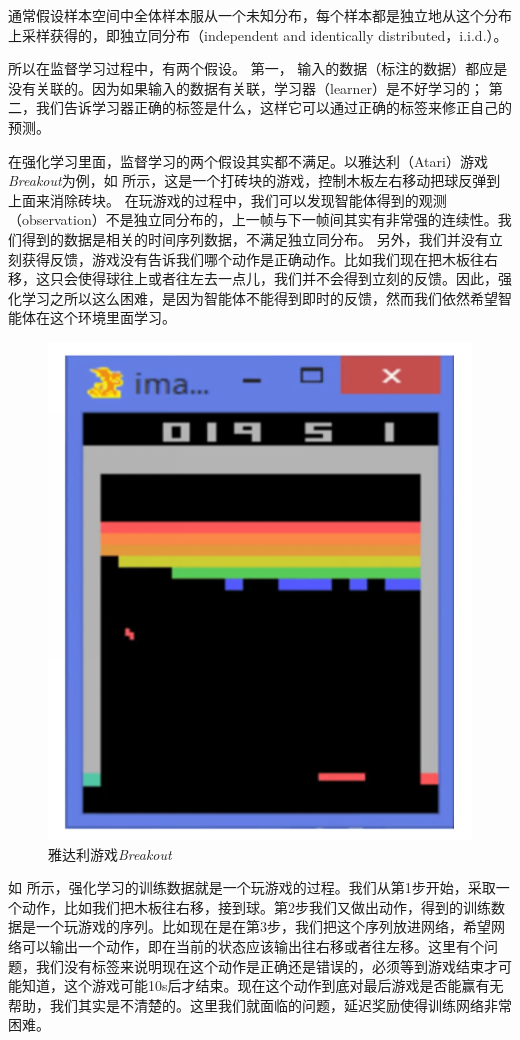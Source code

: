 \begin{tcolorbox}[
    colframe=blue!25,
    colback=blue!10,
    coltitle=blue!20!black,  
    fonttitle=\bfseries,
    ]
    通常假设样本空间中全体样本服从一个未知分布，每个样本都是独立地从这个分布上采样获得的，即独立同分布（independent and identically distributed，i.i.d.）。
\end{tcolorbox}

所以在监督学习过程中，有两个假设。
第一，
    输入的数据（标注的数据）都应是没有关联的。因为如果输入的数据有关联，学习器（learner）是不好学习的；
    第二，我们告诉学习器正确的标签是什么，这样它可以通过正确的标签来修正自己的预测。

在强化学习里面，监督学习的两个假设其实都不满足。以雅达利（Atari）游戏\textit{Breakout}为例，如 所示，这是一个打砖块的游戏，控制木板左右移动把球反弹到上面来消除砖块。
在玩游戏的过程中，我们可以发现智能体得到的观测（observation）不是独立同分布的，上一帧与下一帧间其实有非常强的连续性。我们得到的数据是相关的时间序列数据，不满足独立同分布。
另外，我们并没有立刻获得反馈，游戏没有告诉我们哪个动作是正确动作。比如我们现在把木板往右移，这只会使得球往上或者往左去一点儿，我们并不会得到立刻的反馈。因此，强化学习之所以这么困难，是因为智能体不能得到即时的反馈，然而我们依然希望智能体在这个环境里面学习。

\begin{figure}[htb]
    \centering
    \includegraphics[width=0.3\linewidth]{res/ch1/1.3.png}
    \caption{雅达利游戏\textit{Breakout}}
    \label{fig:Breakout}
\end{figure}

如 所示，强化学习的训练数据就是一个玩游戏的过程。我们从第1步开始，采取一个动作，比如我们把木板往右移，接到球。第2步我们又做出动作，得到的训练数据是一个玩游戏的序列。比如现在是在第3步，我们把这个序列放进网络，希望网络可以输出一个动作，即在当前的状态应该输出往右移或者往左移。这里有个问题，我们没有标签来说明现在这个动作是正确还是错误的，必须等到游戏结束才可能知道，这个游戏可能10s后才结束。现在这个动作到底对最后游戏是否能赢有无帮助，我们其实是不清楚的。这里我们就面临的问题，延迟奖励使得训练网络非常困难。

